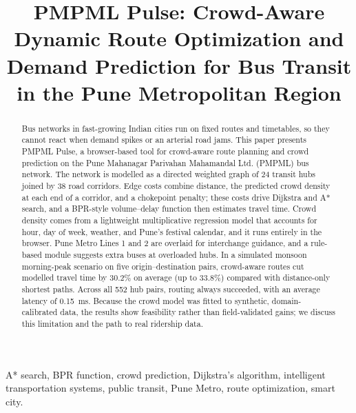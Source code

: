 \documentclass[conference]{IEEEtran}
\begin{document}
\title{PMPML Pulse: Crowd-Aware Dynamic Route Optimization and Demand Prediction for Bus Transit in the Pune Metropolitan Region}

\author{
}

\maketitle

\begin{abstract}
Bus networks in fast-growing Indian cities run on fixed routes and timetables, so they cannot react when demand spikes or an arterial road jams. This paper presents PMPML Pulse, a browser-based tool for crowd-aware route planning and crowd prediction on the Pune Mahanagar Parivahan Mahamandal Ltd. (PMPML) bus network. The network is modelled as a directed weighted graph of 24 transit hubs joined by 38 road corridors. Edge costs combine distance, the predicted crowd density at each end of a corridor, and a chokepoint penalty; these costs drive Dijkstra and A* search, and a BPR-style volume--delay function then estimates travel time. Crowd density comes from a lightweight multiplicative regression model that accounts for hour, day of week, weather, and Pune's festival calendar, and it runs entirely in the browser. Pune Metro Lines 1 and 2 are overlaid for interchange guidance, and a rule-based module suggests extra buses at overloaded hubs. In a simulated monsoon morning-peak scenario on five origin--destination pairs, crowd-aware routes cut modelled travel time by 30.2\% on average (up to 33.8\%) compared with distance-only shortest paths. Across all 552 hub pairs, routing always succeeded, with an average latency of 0.15~ms. Because the crowd model was fitted to synthetic, domain-calibrated data, the results show feasibility rather than field-validated gains; we discuss this limitation and the path to real ridership data.
\end{abstract}

\begin{IEEEkeywords}
A* search, BPR function, crowd prediction, Dijkstra's algorithm, intelligent transportation systems, public transit, Pune Metro, route optimization, smart city.
\end{IEEEkeywords}
\end{document}
